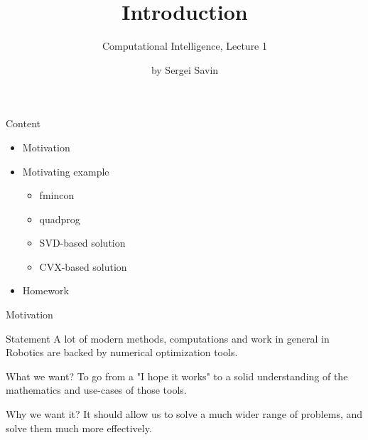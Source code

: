 \documentclass{beamer}
\title{Introduction}
\subtitle{Computational Intelligence, Lecture 1}
\author{by Sergei Savin}
\date{\mydate}
\begin{document}
\maketitle


\begin{frame}{Content}

\begin{itemize}
\item Motivation
\item Motivating example
\begin{itemize}
\item fmincon
\item quadprog
\item SVD-based solution
\item CVX-based solution
\end{itemize}
\item Homework
\end{itemize}

\end{frame}



\begin{frame}{Motivation}
\begin{flushleft}

\begin{block}{Statement}
  A lot of modern methods, computations and work in general in Robotics are backed by numerical optimization tools.
\end{block}

\begin{block}{What we want?}
  To go from a "I hope it works" to a solid understanding of the mathematics and use-cases of those tools.
\end{block}

\begin{block}{Why we want it?}
  It should allow us to solve a much wider range of problems, and solve them much more effectively.
\end{block}

\end{flushleft}
\end{frame}
\end{document}
